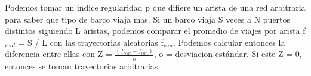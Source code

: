 \documentclass[a4paper, 11pt]{report}
\begin{document}
Podemos tomar un indice regularidad p que difiere un arista de una red
arbitraria para saber que tipo de barco viaja mas. Si un barco viaja S veces a N
puertos distintos siguiendo L aristas, podemos comparar el promedio de viajes por
arista f$_{real}$ = S / L con las trayectorias aleatorias f$_{ran}$. Podemos
calcular entonces la diferencia entre ellas con
Z = $\frac{(f_{real} - f_{ran})}{o}$, o = desviacion estándar. Si este Z = 0,
entonces se toman trayectorias arbitrarias. \\
\end{document}
